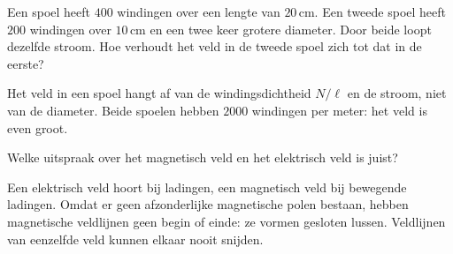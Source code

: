 \documentclass{ximera}
\begin{document}
\begin{question}
    Een spoel heeft $400$ windingen over een lengte van $20\,\mathrm{cm}$. Een tweede spoel heeft $200$ windingen over $10\,\mathrm{cm}$ en een twee keer grotere diameter. Door beide loopt dezelfde stroom. Hoe verhoudt het veld in de tweede spoel zich tot dat in de eerste?

    \begin{multipleChoice}
    \end{multipleChoice}

    \begin{solution}\nl
        Het veld in een spoel hangt af van de windingsdichtheid $N/\ell$ en de stroom, niet van de diameter. Beide spoelen hebben $2000$ windingen per meter: het veld is even groot.
    \end{solution}
\end{question}

\begin{question}
    Welke uitspraak over het magnetisch veld en het elektrisch veld is juist?

    \begin{multipleChoice}
    \end{multipleChoice}

    \begin{solution}\nl
        Een elektrisch veld hoort bij ladingen, een magnetisch veld bij bewegende ladingen. Omdat er geen afzonderlijke magnetische polen bestaan, hebben magnetische veldlijnen geen begin of einde: ze vormen gesloten lussen. Veldlijnen van eenzelfde veld kunnen elkaar nooit snijden.
    \end{solution}
\end{question}
\end{document}
